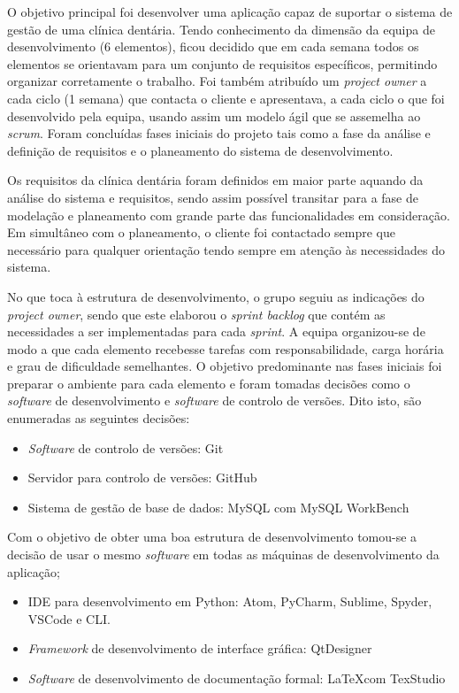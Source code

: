 \documentclass[11pt,a4paper,twoside]{report}
\begin{document}
O objetivo principal foi desenvolver uma aplicação capaz de suportar o sistema de gestão de uma clínica dentária.
Tendo conhecimento da dimensão da equipa de desenvolvimento (6 elementos), ficou decidido que em cada semana todos os elementos se orientavam para um conjunto de requisitos específicos, permitindo organizar corretamente o trabalho. Foi também atribuído um \textit{project owner} a cada ciclo (1 semana) que contacta o cliente e apresentava, a cada ciclo o que foi desenvolvido pela equipa, usando assim um modelo ágil que se assemelha ao \textit{scrum}.
Foram concluídas fases iniciais do projeto tais como a fase da análise e definição de requisitos e o planeamento do sistema de desenvolvimento.

Os requisitos da clínica dentária foram definidos em maior parte aquando da análise do sistema e requisitos, sendo assim possível transitar para a fase de modelação e planeamento com grande parte das funcionalidades em consideração.
Em simultâneo com o planeamento, o cliente foi contactado sempre que necessário para qualquer orientação tendo sempre em atenção às necessidades do sistema. 

No que toca à estrutura de desenvolvimento, o grupo seguiu as indicações do \textit{project owner}, sendo que este elaborou o \textit{sprint backlog} que contém as necessidades a ser implementadas para cada \textit{sprint}.
A equipa organizou-se de modo a que cada elemento recebesse tarefas com responsabilidade, carga horária e grau de dificuldade semelhantes. 
O objetivo predominante nas fases iniciais foi preparar o ambiente para cada elemento e foram tomadas decisões como o \textit{software} de desenvolvimento e \textit{software} de controlo de versões.
Dito isto, são enumeradas as seguintes decisões: 

\begin{itemize}
	\item \textit{Software} de controlo de versões: Git 
	\item Servidor para controlo de versões: GitHub 
	\item Sistema de gestão de base de dados: MySQL com MySQL WorkBench
\end{itemize}


Com o objetivo de obter uma boa estrutura de desenvolvimento tomou-se a decisão de usar o mesmo \textit{software} em todas as máquinas de desenvolvimento da aplicação; 


\begin{itemize}
	\item IDE para desenvolvimento em Python: Atom, PyCharm, Sublime, Spyder, VSCode e CLI. 
	\item \textit{Framework} de desenvolvimento de interface gráfica: QtDesigner 
	\item \textit{Software} de desenvolvimento de documentação formal: \LaTeX \hspace{0.1cm}com TexStudio 
\end{itemize}
\end{document}

